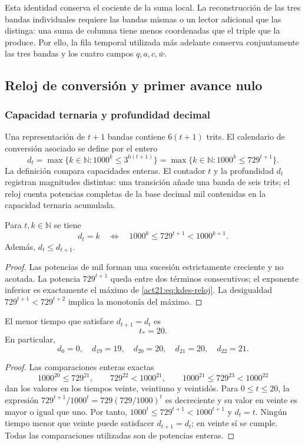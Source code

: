 Esta identidad conserva el cociente de la suma local. La reconstrucción
de las tres bandas individuales requiere las bandas mismas o un lector
adicional que las distinga: una suma de columna tiene menos coordenadas
que el triple que la produce. Por ello, la fila temporal utilizada más
adelante conserva conjuntamente las tres bandas y los cuatro campos
$q,a,c,\bar w$.

\subsection{Reloj de conversión y primer avance nulo}

\subsubsection{Capacidad ternaria y profundidad decimal}

Una representación de $t+1$ bandas contiene $6(t+1)$ trits. El calendario
de conversión asociado se define por el entero
\begin{equation}
 d_t=\max\{k\in\mathbb N:1000^k\leq3^{6(t+1)}\}
     =\max\{k\in\mathbb N:1000^k\leq729^{t+1}\}.
 \label{act21:eq:kdes-reloj}
\end{equation}
La definición compara capacidades enteras. El contador $t$ y la
profundidad $d_t$ registran magnitudes distintas: una transición añade
una banda de seis trits; el reloj cuenta potencias completas de la base
decimal mil contenidas en la capacidad ternaria acumulada.

\begin{lemma}
Para $t,k\in\mathbb N$ se tiene
\[
 d_t=k\quad\Longleftrightarrow\quad
 1000^k\leq729^{t+1}<1000^{k+1}.
\]
Además, $d_t\leq d_{t+1}$.
\end{lemma}
\begin{proof}
Las potencias de mil forman una sucesión estrictamente creciente y no
acotada. La potencia $729^{t+1}$ queda entre dos términos consecutivos;
el exponente inferior es exactamente el máximo de
\eqref{act21:eq:kdes-reloj}. La desigualdad
$729^{t+1}<729^{t+2}$ implica la monotonía del máximo.
\end{proof}

\begin{proposition}
El menor tiempo que satisface $d_{t+1}=d_t$ es
\[
 t_*=20.
\]
En particular,
\[
 d_0=0,\quad d_{19}=19,\quad d_{20}=20,
 \quad d_{21}=20,\quad d_{22}=21.
\]
\end{proposition}
\begin{proof}
Las comparaciones enteras exactas
\[
 1000^{20}\leq729^{21},\qquad
 729^{22}<1000^{21},\qquad
 1000^{21}\leq729^{23}<1000^{22}
\]
dan los valores en los tiempos veinte, veintiuno y veintidós. Para
$0\leq t\leq20$, la expresión
$729^{t+1}/1000^t=729(729/1000)^t$ es decreciente y su valor en veinte
es mayor o igual que uno. Por tanto,
$1000^t\leq729^{t+1}<1000^{t+1}$ y $d_t=t$. Ningún tiempo menor que
veinte puede satisfacer $d_{t+1}=d_t$; en veinte sí se cumple.
Todas las comparaciones utilizadas son de potencias enteras.
\end{proof}

